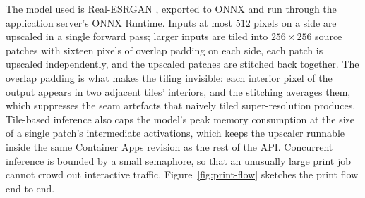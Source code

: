 The model used is Real-ESRGAN \cite{wang2021realesrgan}, exported to ONNX and run through the application server's ONNX Runtime. Inputs at most $512$ pixels on a side are upscaled in a single forward pass; larger inputs are tiled into $256 \times 256$ source patches with sixteen pixels of overlap padding on each side, each patch is upscaled independently, and the upscaled patches are stitched back together. The overlap padding is what makes the tiling invisible: each interior pixel of the output appears in two adjacent tiles' interiors, and the stitching averages them, which suppresses the seam artefacts that naively tiled super-resolution produces. Tile-based inference also caps the model's peak memory consumption at the size of a single patch's intermediate activations, which keeps the upscaler runnable inside the same Container Apps revision as the rest of the API. Concurrent inference is bounded by a small semaphore, so that an unusually large print job cannot crowd out interactive traffic. Figure~\ref{fig:print-flow} sketches the print flow end to end.


